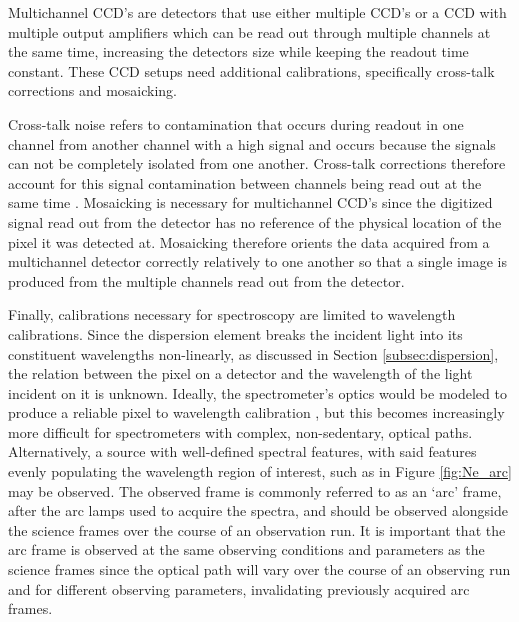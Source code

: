 Multichannel \gls{CCD}'s are detectors that use either multiple \gls{CCD}'s or a \gls{CCD} with multiple output amplifiers which can be read out through multiple channels at the same time, increasing the detectors size while keeping the readout time constant. These \gls{CCD} setups need additional calibrations, specifically cross-talk corrections and mosaicking.
\prgph

Cross-talk noise refers to contamination that occurs during readout in one channel from another channel with a high signal and occurs because the signals can not be completely isolated from one another. Cross-talk corrections therefore account for this signal contamination between channels being read out at the same time \citep{CrossTalk}. Mosaicking is necessary for multichannel \gls{CCD}'s since the digitized signal read out from the detector has no reference of the physical location of the pixel it was detected at. Mosaicking therefore orients the data acquired from a multichannel detector correctly relatively to one another so that a single image is produced from the multiple channels read out from the detector.
\prgph

Finally, calibrations necessary for spectroscopy are limited to wavelength calibrations. Since the dispersion element breaks the incident light into its constituent wavelengths non-linearly, as discussed in Section \ref{subsec:dispersion}, the relation between the pixel on a detector and the wavelength of the light incident on it is unknown. Ideally, the spectrometer's optics would be modeled to produce a reliable pixel to wavelength calibration \citep[see E.g.][]{WavCalSpectraModel}, but this becomes increasingly more difficult for spectrometers with complex, non-sedentary, optical paths. Alternatively, a source with well-defined spectral features, with said features evenly populating the wavelength region of interest, such as in Figure \ref{fig:Ne_arc} may be observed. The observed frame is commonly referred to as an `arc' frame, after the arc lamps used to acquire the spectra, and should be observed alongside the science frames over the course of an observation run. It is important that the arc frame is observed at the same observing conditions and parameters as the science frames since the optical path will vary over the course of an observing run and for different observing parameters, invalidating previously acquired arc frames.
\prgph

